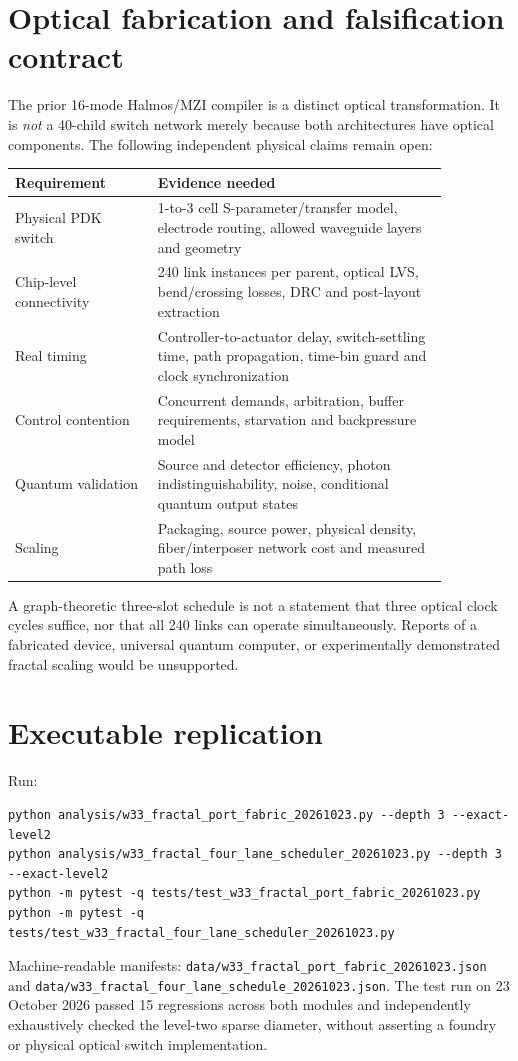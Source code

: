 \documentclass[10pt]{article}
\begin{document}
\section{Optical fabrication and falsification contract}
The prior 16-mode Halmos/MZI compiler is a distinct optical
transformation. It is \emph{not} a 40-child switch network merely
because both architectures have optical components.
The following independent physical claims remain open:
\begin{longtable}{p{0.28\linewidth}p{0.58\linewidth}}
\toprule Requirement & Evidence needed\\\midrule
Physical PDK switch & 1-to-3 cell S-parameter/transfer model,
electrode routing, allowed waveguide layers and geometry\\
Chip-level connectivity & 240 link instances per parent,
optical LVS, bend/crossing losses, DRC and post-layout extraction\\
Real timing & Controller-to-actuator delay, switch-settling
time, path propagation, time-bin guard and clock synchronization\\
Control contention & Concurrent demands, arbitration,
buffer requirements, starvation and backpressure model\\
Quantum validation & Source and detector efficiency,
photon indistinguishability, noise, conditional quantum output states\\
Scaling & Packaging, source power, physical density,
fiber/interposer network cost and measured path loss\\\bottomrule
\end{longtable}
A graph-theoretic three-slot schedule is not a statement that
three optical clock cycles suffice, nor that all 240 links can
operate simultaneously. Reports of a fabricated device,
universal quantum computer, or experimentally demonstrated
fractal scaling would be unsupported.

\section{Executable replication}
Run:
\begin{verbatim}
python analysis/w33_fractal_port_fabric_20261023.py --depth 3 --exact-level2
python analysis/w33_fractal_four_lane_scheduler_20261023.py --depth 3 --exact-level2
python -m pytest -q tests/test_w33_fractal_port_fabric_20261023.py
python -m pytest -q tests/test_w33_fractal_four_lane_scheduler_20261023.py
\end{verbatim}
Machine-readable manifests:
\texttt{data/w33\_fractal\_port\_fabric\_20261023.json} and
\texttt{data/w33\_fractal\_four\_lane\_schedule\_20261023.json}.
The test run on 23 October 2026 passed 15 regressions across both
modules and independently exhaustively checked the level-two
sparse diameter, without asserting a foundry or physical
optical switch implementation.
\end{document}
